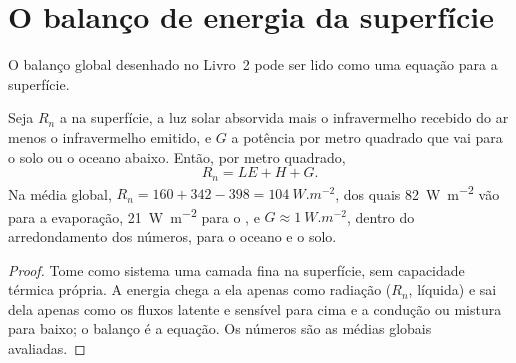 \section{O balanço de energia da superfície}\label{sec:b1:radiation-heat-transport:surface}

O balanço global desenhado no Livro~2 pode ser lido como uma equação para a superfície.

\begin{proposition}\label{prop:b1:radiation-heat-transport:surface}
Seja $R_n$ a  na superfície, a luz solar absorvida mais o infravermelho recebido do
ar menos o infravermelho emitido, e $G$ a potência por metro quadrado que vai para o solo ou o
oceano abaixo. Então, por metro quadrado,
\[
  R_n = LE + H + G .
\]
Na média global, $R_n = 160 + 342 - 398 = \qty{104}{W.m^{-2}}$, dos quais \qty{82}{W.m^{-2}} vão
para a evaporação, \qty{21}{W.m^{-2}} para o , e $G \approx \qty{1}{W.m^{-2}}$,
dentro do arredondamento dos números, para o oceano e o solo.
\end{proposition}

\begin{proof}
Tome como sistema uma camada fina na superfície, sem capacidade térmica própria. A energia chega a
ela apenas como radiação ($R_n$, líquida) e sai dela apenas como os fluxos latente e sensível para
cima e a condução ou mistura para baixo; o balanço é a equação. Os números são as médias globais
avaliadas.
\end{proof}

